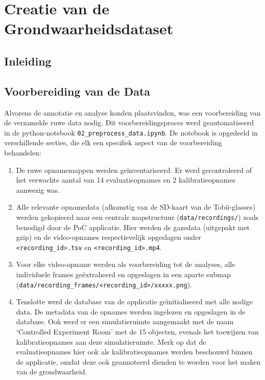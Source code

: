 \chapter{Creatie van de Grondwaarheidsdataset}
\label{ch:grondwaarheid}

\section{Inleiding}


\section{Voorbereiding van de Data}

Alvorens de annotatie en analyse konden plaatsvinden, was een voorbereiding van de verzamelde ruwe data nodig.
Dit voorbereidingsproces werd geautomatiseerd in de python-notebook \texttt{02\_preprocess\_data.ipynb}.
De notebook is opgedeeld in verschillende secties, die elk een specifiek aspect van de voorbereiding behandelen:
\begin{enumerate}
    \item De ruwe opnamemappen werden geïnventariseerd. Er werd gecontroleerd of het verwachte aantal van 14 evaluatieopnames 
    en 2 kalibratieopnames aanwezig was.
    \item Alle relevante opnamedata (afkomstig van de SD-kaart van de Tobii-glasses) werden gekopieerd naar een centrale 
    mapstructuur (\texttt{data/recordings/}) zoals benodigd door de PoC applicatie.
    Hier werden de gazedata (uitgepakt met gzip) en de video-opnames respectievelijk opgeslagen onder \texttt{<recording\_id>.tsv} 
    en \texttt{<recording\_id>.mp4}.
    \item Voor elke video-opname werden als voorbereiding tot de analyses, alle individuele frames geëxtraheerd en opgeslagen 
    in een aparte submap (\texttt{data/recording\_frames/<recording\_id>/xxxxx.png}).
    \item Tenslotte werd de database van de applicatie geïnitialiseerd met alle nodige data. De metadata van de opnames werden 
    ingelezen en opgeslagen in de database.
    Ook werd er een simulatieruimte aangemaakt met de naam `Controlled Experiment Room' met de 15 objecten, evenals het toewijzen 
    van kalibratieopnames aan deze simulatieruimte.
    Merk op dat de evaluatieopnames hier ook als kalibratieopnames werden beschouwd binnen de applicatie, omdat deze ook geannoteerd 
    dienden te worden voor het maken van de grondwaarheid.
\end{enumerate}

